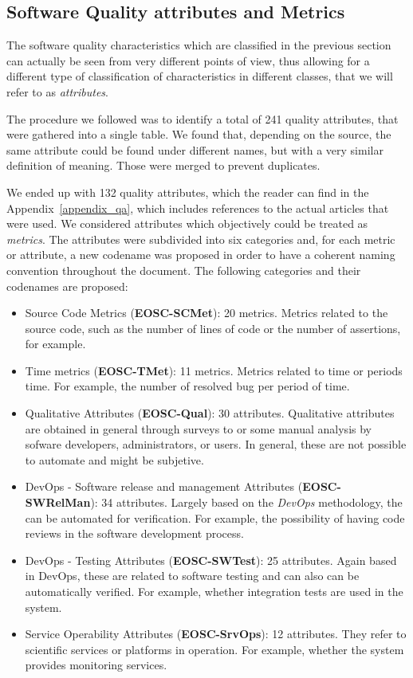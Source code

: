 \subsection{Software Quality attributes and Metrics}
\label{subsec:SW_quality_attributes}
The software quality characteristics which are classified in the previous section can actually be seen from very different points of view, thus allowing for a different type of classification of characteristics in different classes, that we will refer to as \textit{attributes}.

The procedure we followed was to identify a total of 241 quality attributes, that were gathered into a single table. We found that, depending on the source, the same attribute could be found under different names, but with a very similar definition of meaning. Those were merged to prevent duplicates.

We ended up with 132 quality attributes, which the reader can find in the Appendix~\ref{appendix_qa}, which includes references to the actual articles that were used. We considered attributes which objectively could be treated as \textit{metrics}. The attributes were subdivided into six categories and, for each metric or attribute, a new codename was proposed in order to have a coherent naming convention throughout the document. The following categories and their codenames are proposed:

\begin{itemize}
    \item Source Code Metrics (\textbf{EOSC-SCMet}): 20 metrics. Metrics related to the source code, such as the number of lines of code or the number of assertions, for example.
    \item Time metrics (\textbf{EOSC-TMet}): 11 metrics. Metrics related to time or periods time. For example, the number of resolved bug per period of time.
    \item Qualitative Attributes (\textbf{EOSC-Qual}): 30 attributes. Qualitative attributes are obtained in general through surveys to or some manual analysis by sofware developers, administrators, or users. In general, these are not possible to automate and might be subjetive.
    \item DevOps - Software release and management Attributes (\textbf{EOSC-SWRelMan}): 34 attributes. Largely based on the \textit{DevOps} methodology, the can be automated for verification. For example, the possibility of having code reviews in the software development process.
    \item DevOps - Testing Attributes (\textbf{EOSC-SWTest}): 25 attributes. Again based in DevOps, these are related to software testing and can also can be automatically verified. For example, whether integration tests are used in the system.
    \item Service Operability Attributes (\textbf{EOSC-SrvOps}): 12 attributes. They refer to scientific services or platforms in operation. For example, whether the system provides monitoring services.
\end{itemize}

